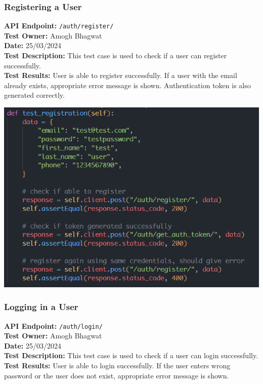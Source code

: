 \documentclass[11pt]{article}
\begin{document}
\subsubsection{Registering a User}
\textbf{API Endpoint: } \texttt{/auth/register/} \\
\textbf{Test Owner: } Amogh Bhagwat \\
\textbf{Date: } 25/03/2024 \\
\textbf{Test Description: } This test case is used to check if a user can register successfully. \\
\textbf{Test Results: } User is able to register successfully. If a user with the email already exists, appropriate error message is shown. Authentication token is also generated correctly. \\
\begin{center}
    \includegraphics[scale=0.8]{unit_testing_codes/register.png}
\end{center}

\subsubsection{Logging in a User}
\textbf{API Endpoint: } \texttt{/auth/login/} \\
\textbf{Test Owner: } Amogh Bhagwat \\
\textbf{Date: } 25/03/2024 \\
\textbf{Test Description: } This test case is used to check if a user can login successfully. \\
\textbf{Test Results: } User is able to login successfully. If the user enters wrong password or the user does not exist, appropriate error message is shown. \\
\end{document}
